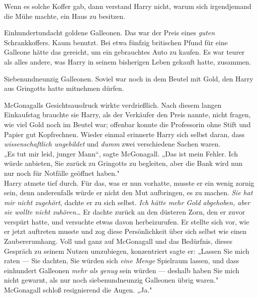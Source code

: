 {Wenn es solche Koffer gab, dann verstand Harry nicht, warum sich irgendjemand die Mühe machte, ein Haus zu besitzen.

Einhundertundacht goldene Galleonen. Das war der Preis eines \emph{guten} Schrankkoffers. Kaum benutzt. Bei etwa fünfzig britischen Pfund für eine Galleone hätte das gereicht, um ein gebrauchtes Auto zu kaufen. Es war teurer als alles andere, was Harry in seinem bisherigen Leben gekauft hatte, zusammen.

Siebenundneunzig Galleonen. Soviel war noch in dem Beutel mit Gold, den Harry aus Gringotts hatte mitnehmen dürfen.

McGonagalls Gesichtsausdruck wirkte verdrießlich. Nach diesem langen Einkaufstag brauchte sie Harry, als der Verkäufer den Preis nannte, nicht fragen, wie viel Gold noch im Beutel war; offenbar konnte die Professorin ohne Stift und Papier gut Kopfrechnen. Wieder einmal erinnerte Harry sich selbst daran, dass \emph{wissenschaftlich ungebildet} und \emph{dumm} zwei verschiedene Sachen waren.\\ „Es tut mir leid, junger Mann“, sagte McGonagall. „Das ist mein Fehler. Ich würde anbieten, Sie zurück zu Gringotts zu begleiten, aber die Bank wird nun nur noch für Notfälle geöffnet haben."\\ Harry atmete tief durch. Für das, was er nun vorhatte, musste er ein wenig zornig sein, denn anderenfalls würde er nicht den Mut aufbringen, es zu machen. \emph{Sie hat mir nicht zugehört}, dachte er zu sich selbst. \emph{Ich hätte mehr Gold abgehoben, aber sie wollte nicht zuhören…} Er dachte zurück an den düsteren Zorn, den er zuvor verspürt hatte, und versuchte etwas davon herbeizurufen. Er stellte sich vor, wie er jetzt auftreten musste und zog diese Persönlichkeit über sich selbst wie einen Zaubererumhang. Voll und ganz auf McGonagall und das Bedürfnis, dieses Gespräch zu seinem Nutzen umzubiegen, konzentriert sagte er: „Lassen Sie mich raten --- Sie dachten, Sie würden sich \emph{eine Menge} Spielraum lassen, und dass einhundert Galleonen \emph{mehr als genug} sein würden --- deshalb haben Sie mich nicht gewarnt, als nur noch siebenundneunzig Galleonen übrig waren."\\ McGonagall schloß resignierend die Augen. „Ja."

}
